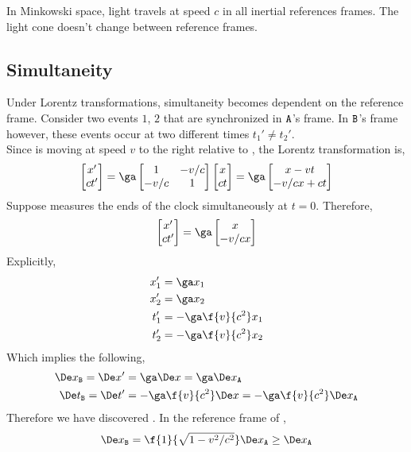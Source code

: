 \documentclass{article}
\begin{document}
In Minkowski space, light travels at speed $c$ in all inertial references frames. The light cone doesn't change between reference frames.

\subsection{Simultaneity}

Under Lorentz transformations, simultaneity becomes dependent on the reference frame. Consider two events $1$, $2$ that are synchronized in $\texttt{A}$'s frame. In $\texttt{B}$'s frame however, these events occur at two different times $t_1' \neq t_2'$. \\

Since  is moving at speed $v$ to the right relative to , the Lorentz transformation is,
\[ \sqm{x' \\ ct'} = \ga\sqm{1 & -v / c \\ -v /c & 1} \sqm{x \\ ct} = \ga \sqm{x - v t \\ -v /c x + c t} \]
Suppose  measures the ends of the clock simultaneously at $t = 0$. Therefore,
\[ \sqm{x' \\ ct'} = \ga \sqm{x \\- v /c x}  \]
Explicitly,
\begin{align*}
x'_1 &= \ga x_1 \\
x'_2 &= \ga x_2 \\
t'_1 &= -\ga \f{v}{c^2} x_1 \\
t'_2 &= -\ga \f{v}{c^2} x_2
\end{align*}
Which implies the following,
\begin{align*}
\De x_{\p{B}} = \De x' &= \ga \De x = \ga \De x_{\p{A}} \\
\De t_{\p{B}} = \De t' &= -\ga \f{v}{c^2} \De x = -\ga \f{v}{c^2} \De x_{\p{A}}
\end{align*}
Therefore we have discovered . In the reference frame of ,
\[ \De x_{\p{B}} = \f{1}{\sqrt{1 - v^2 /c^2}} \De x_{\p{A}} \geq \De x_{\p{A}}\]
\end{document}
